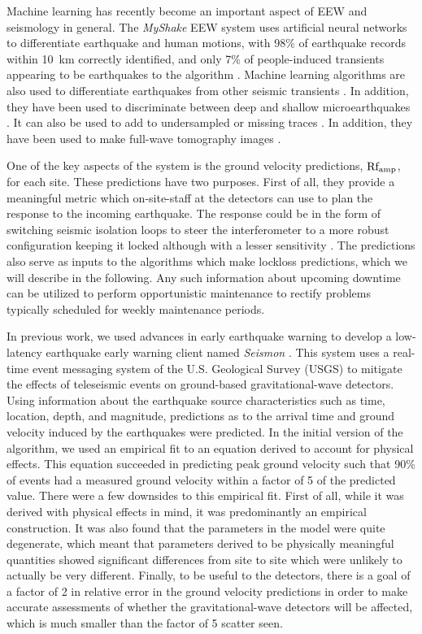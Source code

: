 \documentclass[preprint, aps, showpacs]{revtex4-1}
\begin{document}
Machine learning has recently become an important aspect of EEW and seismology in general.
The \emph{MyShake} EEW system uses artificial neural networks to differentiate earthquake and human motions, with 98\% of earthquake records within 10\, km correctly identified, and only 7\% of people-induced transients appearing to be earthquakes to the algorithm  \cite{KoAl2016}.
Machine learning algorithms are also used to differentiate earthquakes from other seismic transients \cite{KuYi2011,KoUs2016,PeGh2017}.
In addition, they have been used to discriminate between deep and shallow microearthquakes \cite{MoHo2016}.
It can also be used to add to undersampled or missing traces \cite{JiMa2017}.
In addition, they have been used to make full-wave tomography images \cite{DiLe2011}.

One of the key aspects of the system is the ground velocity predictions, $\rm Rf_{amp}$, for each site. These predictions have two purposes. 
First of all, they provide a meaningful metric which on-site-staff at the detectors can use to plan the response to the incoming earthquake. The response could be in the form of switching seismic isolation loops to steer the interferometer to a more robust configuration keeping it locked although with a lesser sensitivity \cite{BiWa2018}. The predictions also serve as inputs to the algorithms which make lockloss predictions, which we will describe in the following. Any such information about upcoming downtime can be utilized to perform opportunistic maintenance to rectify problems typically scheduled for weekly maintenance periods.

In previous work, we used advances in early earthquake warning to develop a low-latency earthquake early warning client named \emph{Seismon} \cite{CoEa2017}. This system uses a real-time event messaging system of the U.S. Geological Survey (USGS) to mitigate the effects of teleseismic events on ground-based gravitational-wave detectors. 
Using information about the earthquake source characteristics such as time, location, depth, and magnitude, predictions as to the arrival time and ground velocity induced by the earthquakes were predicted.
In the initial version of the algorithm, we used an empirical fit to an equation derived to account for physical effects. This equation succeeded in predicting peak ground velocity such that 90\% of events had a measured ground velocity within a factor of 5 of the predicted value.
There were a few downsides to this empirical fit.
First of all, while it was derived with physical effects in mind, it was predominantly an empirical construction.
It was also found that the parameters in the model were quite degenerate, which meant that parameters derived to be physically meaningful quantities showed significant differences from site to site which were unlikely to actually be very different.
Finally, to be useful to the detectors, there is a goal of a factor of 2 in relative error in the ground velocity predictions in order to make accurate assessments of whether the gravitational-wave detectors will be affected, which is much smaller than the factor of 5 scatter seen. 
\end{document}
